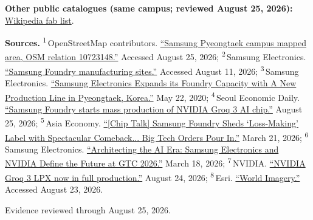 \begin{minipage}[t][0.90\textheight][t]{\textwidth}
\begin{itemize}[leftmargin=1.25em,itemsep=0.35em,topsep=0.15em,parsep=0pt]
\end{itemize}
\smallskip
{\sffamily\scriptsize\color{black!62}\textbf{Other public catalogues (same campus; reviewed August 25, 2026):} \href{\detokenize{https://en.wikipedia.org/w/index.php?title=List_of_semiconductor_fabrication_plants&oldid=1370451124}\#\detokenize{Open_plants}}{Wikipedia fab list}.\par}
\medskip
{\sffamily\scriptsize\setlength{\emergencystretch}{1.5em}\textbf{Sources.} \textsuperscript{1}\,OpenStreetMap contributors. \href{\detokenize{https://www.openstreetmap.org/relation/10723148}}{\enquote{Samsung Pyeongtaek campus mapped area, OSM relation 10723148.}} Accessed August 25, 2026; \textsuperscript{2}\,Samsung Electronics. \href{\detokenize{https://semiconductor.samsung.com/foundry/manufacturing/manufacturing-sites/}}{\enquote{Samsung Foundry manufacturing sites.}} Accessed August 11, 2026; \textsuperscript{3}\,Samsung Electronics. \href{\detokenize{https://semiconductor.samsung.com/news-events/news/samsung-electronics-expands-its-foundry-capacity-with-a-new-production-line-in-pyeongtaek-korea/}}{\enquote{Samsung Electronics Expands its Foundry Capacity with A New Production Line in Pyeongtaek, Korea.}} May 22, 2020; \textsuperscript{4}\,Seoul Economic Daily. \href{\detokenize{https://en.sedaily.com/finance/2026/08/25/samsung-foundry-starts-mass-production-of-nvidias-groq3-ai}}{\enquote{Samsung Foundry starts mass production of NVIDIA Groq 3 AI chip.}} August 25, 2026; \textsuperscript{5}\,Asia Economy. \href{\detokenize{https://www.asiae.co.kr/en/article/2026032011275710431}}{\enquote{[Chip Talk] Samsung Foundry Sheds `Loss-Making' Label with Spectacular Comeback... Big Tech Orders Pour In.}} March 21, 2026; \textsuperscript{6}\,Samsung Electronics. \href{\detokenize{https://semiconductor.samsung.com/news-events/tech-blog/architecting-the-ai-era-samsung-electronics-and-nvidia-define-the-future-at-gtc-2026/}}{\enquote{Architecting the AI Era: Samsung Electronics and NVIDIA Define the Future at GTC 2026.}} March 18, 2026; \textsuperscript{7}\,NVIDIA. \href{\detokenize{https://investor.nvidia.com/news/press-release-details/2026/NVIDIA-Groq-3-LPX-Now-in-Full-Production-With-World-Class-Speed-for-Agentic-AI/default.aspx}}{\enquote{NVIDIA Groq 3 LPX now in full production.}} August 24, 2026; \textsuperscript{8}\,Esri. \href{\detokenize{https://www.arcgis.com/home/item.html?id=10df2279f9684e4a9f6a7f08febac2a9}}{\enquote{World Imagery.}} Accessed August 23, 2026.\par}
\vfill
\noindent{\color{hairline}\rule{\linewidth}{0.4pt}}\par\smallskip
{\sffamily\scriptsize\color{black!58} Evidence reviewed through August 25, 2026.\par}
\end{minipage}
